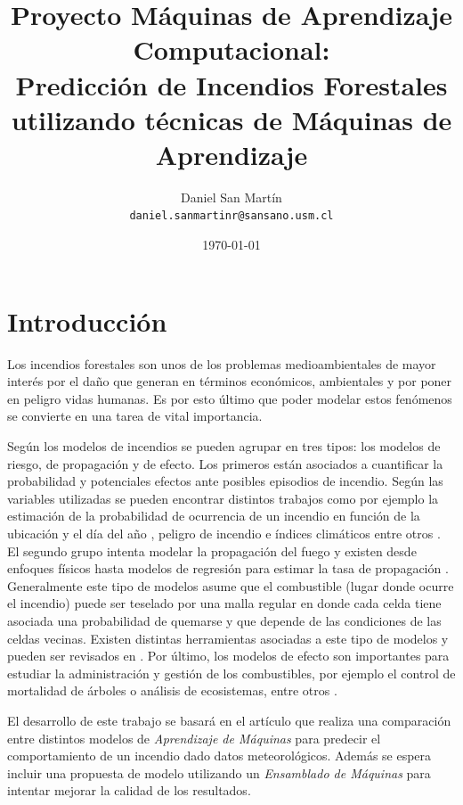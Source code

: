 \documentclass[spanish]{article}
\title{Proyecto Máquinas de Aprendizaje Computacional: \\
	\large{Predicción de Incendios Forestales utilizando técnicas de Máquinas de Aprendizaje}}
\author{Daniel San Martín \\ 
	\texttt{daniel.sanmartinr@sansano.usm.cl}
}
\date{\today}
\begin{document}
	\renewcommand{\BOthers}[1]{et al.\hbox{}}
	
  \maketitle
    
  \section{Introducción}

    Los incendios forestales son unos de los problemas medioambientales de mayor interés por el daño que generan
    en términos económicos, ambientales y por poner en peligro vidas humanas. Es por esto último que poder modelar
    estos fenómenos se convierte en una tarea de vital importancia. \medskip
    
    Según \cite{preisler2013forest} los modelos de incendios se pueden agrupar en tres tipos: los modelos de riesgo, de 
    propagación y de efecto. Los primeros están asociados a cuantificar la probabilidad y potenciales efectos ante 
    posibles episodios de incendio. Según las variables utilizadas se pueden encontrar distintos trabajos como por ejemplo
    la estimación de la probabilidad de ocurrencia de un incendio en función de la ubicación y el día del año 
    \cite{brillinger2003risk,hernandez2010integrating}, peligro de incendio e índices climáticos \cite{van1987development,
    burgan19881988} entre otros \cite{braun2010forest,ager2007modeling,calkin2011comparative}. El segundo grupo intenta 
    modelar la propagación del fuego y existen desde enfoques físicos \cite{rothermel1972mathematical} hasta modelos de 
    regresión para estimar la tasa de propagación \cite{sullivan2009wildland}. Generalmente este tipo de modelos asume que 
    el combustible (lugar donde ocurre el incendio) puede ser teselado por una malla regular en donde cada celda tiene 
    asociada una probabilidad de quemarse y que depende de las condiciones de las celdas vecinas. Existen distintas 
    herramientas asociadas a este tipo de modelos y pueden ser revisados en \cite{andrews1986behave,finney2006overview,
    finney1998farsite,finney2011simulation,finney2011method}. Por último, los modelos de efecto son importantes
    para estudiar la administración y gestión de los combustibles, por ejemplo el control de mortalidad de árboles 
    o análisis de ecosistemas, entre otros \cite{Larkin-2009,reinhardt2003using,robichaud2007predicting}. \medskip
    
    El desarrollo de este trabajo se basará en el artículo \cite{cortez} que realiza una comparación entre distintos 
    modelos de \emph{Aprendizaje de Máquinas} para predecir el comportamiento de un incendio dado datos meteorológicos. 
    Además se espera incluir una propuesta de modelo utilizando un \emph{Ensamblado de Máquinas} para intentar mejorar 
    la calidad de los resultados. 
            
\end{document}
